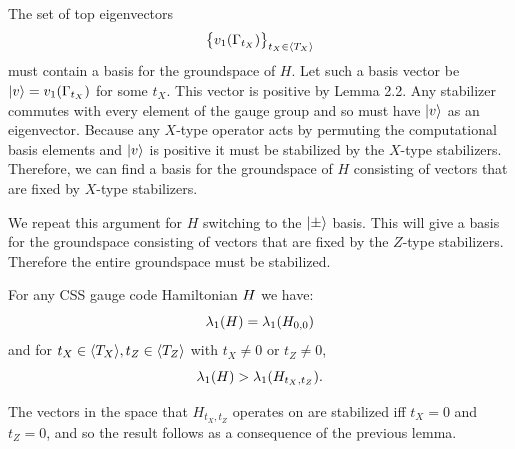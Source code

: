 \doproof
The set of top eigenvectors 
$$
    \bigl\{ v_1(\Gamma_{t_X}) \bigr\}_{t_X\in\langle T_X \rangle}
$$
must contain a basis for the groundspace of $H.$
Let such a basis vector be $|{v}\rangle = v_1(\Gamma_{t_X})$ for some $t_X.$
This vector is positive by Lemma 2.2.
Any stabilizer commutes with
every element of the gauge group and so
must have $|{v}\rangle$ as an eigenvector.
Because any
$X$-type operator acts by permuting the computational basis elements 
and $|{v}\rangle$ is positive it must be stabilized by the
$X$-type stabilizers.
Therefore, we can find a basis for the groundspace of
$H$ consisting of vectors that are fixed by $X$-type
stabilizers.

We repeat this argument for $H$ switching to the
$|{\pm}\rangle$ basis. This will give a basis for the groundspace
consisting of vectors that are fixed by the $Z$-type
stabilizers.
Therefore the entire groundspace must be stabilized.
\tombstone

For any CSS gauge code Hamiltonian $H$
we have:
$$\lambda_1(H) = \lambda_1(H_{0,0})$$
and for $t_X\in\langle T_X \rangle, t_Z\in\langle T_Z \rangle$
with $t_X\ne 0$ or $t_Z\ne 0$,
$$
\lambda_1(H) > \lambda_1(H_{t_X,t_Z}).
$$

\doproof
The vectors in the space that 
$H_{t_X,t_Z}$ operates on 
are stabilized iff $t_X=0$ and $t_Z=0$,
and so the result follows as a 
consequence of the previous lemma.
\tombstone

